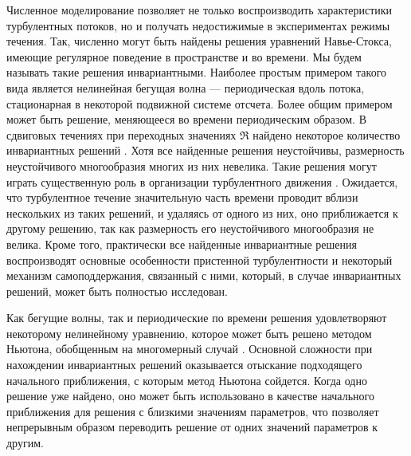 Численное моделирование позволяет не только воспроизводить характеристики турбулентных потоков, но и получать недостижимые в экспериментах режимы течения. Так, численно могут быть найдены решения уравнений Навье-Стокса, имеющие регулярное поведение в пространстве и во времени. Мы будем называть такие решения инвариантными. Наиболее простым примером такого вида является нелинейная бегущая волна --- периодическая вдоль потока, стационарная в некоторой подвижной системе отсчета. Более общим примером может быть решение, меняющееся во времени периодическим образом. В сдвиговых течениях при переходных значениях $\Re$ найдено некоторое количество инвариантных решений \cite{Kawahara2012}. Хотя все найденные решения неустойчивы, размерность неустойчивого многообразия многих из них невелика. Такие решения могут играть существенную роль в организации турбулентного движения \cite{Chaosbook}. Ожидается, что турбулентное течение значительную часть времени проводит вблизи нескольких из таких решений, и удаляясь от одного из них, оно приближается к другому решению, так как размерность его неустойчивого многообразия не велика. Кроме того, практически все найденные инвариантные решения воспроизводят основные особенности пристенной турбулентности и некоторый механизм самоподдержания, связанный с ними, который, в случае инвариантных решений, может быть полностью исследован. 

Как бегущие волны, так и периодические по времени решения удовлетворяют некоторому нелинейному уравнению, которое может быть решено методом Ньютона, обобщенным на многомерный случай \cite{Viswanath2007, Dijkstra2014}. Основной сложности при нахождении инвариантных решений оказывается отыскание подходящего начального приближения, с которым метод Ньютона сойдется. Когда одно решение уже найдено, оно может быть использовано в качестве начального приближения для решения с близкими значениям параметров, что позволяет непрерывным образом переводить решение от одних значений параметров к другим. 

